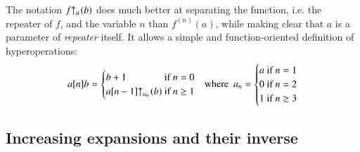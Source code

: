The notation $\rf{f}{a}(b)$ does much better at separating the function, i.e. the repeater of $f$, and the variable $n$ than $f^{(n)}(a)$, while making clear that $a$ is a parameter of \emph{repeater} itself. It allows a simple and function-oriented definition of hyperoperations:
\begin{equation}
a[n]b = \begin{cases}
b + 1 & \hspace{-10pt}\text{ if } n = 0 \\
\rf{a[n-1]}{a_n}(b) & \hspace{-10pt}\text{ if } n \ge 1
\end{cases}
\ \ \text{ where } \ a_n = \begin{cases}
a & \hspace{-10pt}\text{ if } n = 1 \\
0 & \hspace{-10pt}\text{ if } n = 2 \\
1 & \hspace{-10pt}\text{ if } n \ge 3
\end{cases}
\end{equation}

\subsection{Increasing expansions and their inverse}

